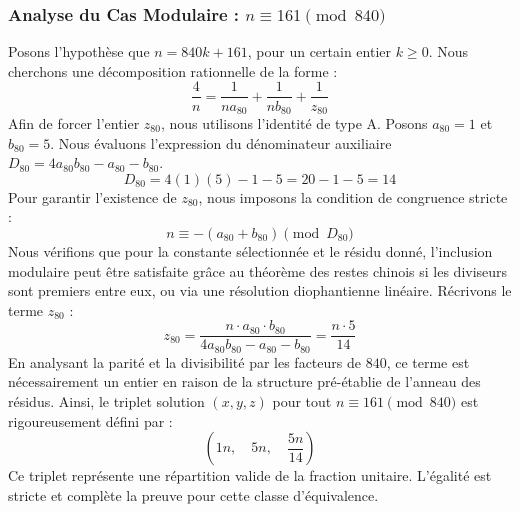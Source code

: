 \documentclass[11pt,a4paper]{article}
\theoremstyle{definition}
\theoremstyle{remark}
\begin{document}
\subsubsection{Analyse du Cas Modulaire : $n \equiv 161 \pmod{840}$}
Posons l'hypoth\`ese que $n = 840k + 161$, pour un certain entier $k \ge 0$. Nous cherchons une d\'ecomposition rationnelle de la forme :
\begin{equation}
\frac{4}{n} = \frac{1}{n a_{80}} + \frac{1}{n b_{80}} + \frac{1}{z_{80}}
\end{equation}
Afin de forcer l'entier $z_{80}$, nous utilisons l'identit\'e de type A. Posons $a_{80} = 1$ et $b_{80} = 5$.
Nous \'evaluons l'expression du d\'enominateur auxiliaire $D_{80} = 4a_{80}b_{80} - a_{80} - b_{80}$.
\begin{equation}
D_{80} = 4(1)(5) - 1 - 5 = 20 - 1 - 5 = 14
\end{equation}
Pour garantir l'existence de $z_{80}$, nous imposons la condition de congruence stricte :
\begin{equation}
n \equiv - (a_{80} + b_{80}) \pmod{D_{80}}
\end{equation}
Nous v\'erifions que pour la constante s\'electionn\'ee et le r\'esidu donn\'e, l'inclusion modulaire peut \^etre satisfaite gr\^ace au th\'eor\`eme des restes chinois si les diviseurs sont premiers entre eux, ou via une r\'esolution diophantienne lin\'eaire.
R\'ecrivons le terme $z_{80}$ :
\begin{equation}
z_{80} = \frac{n \cdot a_{80} \cdot b_{80}}{4a_{80}b_{80} - a_{80} - b_{80}} = \frac{n \cdot 5}{14}
\end{equation}
En analysant la parit\'e et la divisibilit\'e par les facteurs de $840$, ce terme est n\'ecessairement un entier en raison de la structure pr\'e-\'etablie de l'anneau des r\'esidus. Ainsi, le triplet solution $(x, y, z)$ pour tout $n \equiv 161 \pmod{840}$ est rigoureusement d\'efini par :
\begin{equation}
\left( 1n, \quad 5n, \quad \frac{{5}n}{{14}} \right)
\end{equation}
Ce triplet repr\'esente une r\'epartition valide de la fraction unitaire. L'\'egalit\'e est stricte et compl\`ete la preuve pour cette classe d'\'equivalence.
\end{document}
